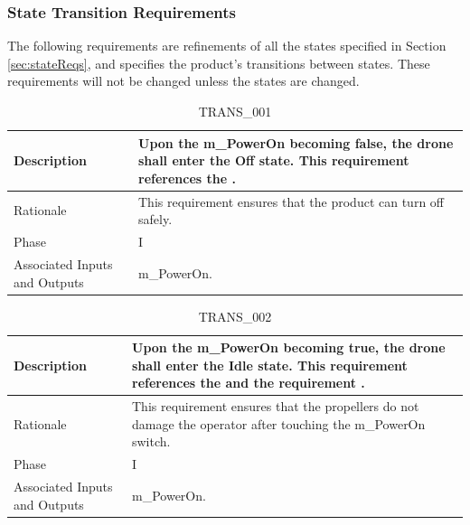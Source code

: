 \documentclass{article}
\begin{document}
\clearpage
\newpage

\subsubsection{State Transition Requirements}
\label{transReqs}
The following requirements are refinements of all the states specified in Section \ref{sec:stateReqs}, and specifies the product's transitions between states. These requirements will not be changed unless the states are changed.

\begin{table}[!h]
\begin{center}
\caption {TRANS\_001} 
\label{TRANS_001}
\begin{tabular}{ | m{3cm} | m{11cm} | }
\hline
Description & Upon the m\_PowerOn becoming false, the drone shall enter the Off state. This requirement references the \nameref{Off State}. \\
\hline
Rationale & This requirement ensures that the product can turn off safely. \\
\hline
Phase & I \\
\hline
Associated Inputs and Outputs & m\_PowerOn. \\
\hline
\end{tabular}
\end{center}
\end{table}

\begin{table}[!h]
\begin{center}
\caption {TRANS\_002} 
\label{TRANS_002}
\begin{tabular}{ | m{3cm} | m{11cm} | }
\hline
Description & Upon the m\_PowerOn becoming true, the drone shall enter the Idle state. This requirement references the \nameref{Idle State} and the requirement \nameref{SAFE_005}. \\
\hline
Rationale & This requirement ensures that the propellers do not damage the operator after touching the m\_PowerOn switch.  \\
\hline
Phase & I \\
\hline
Associated Inputs and Outputs & m\_PowerOn. \\
\hline
\end{tabular}
\end{center}
\end{table}
\end{document}
